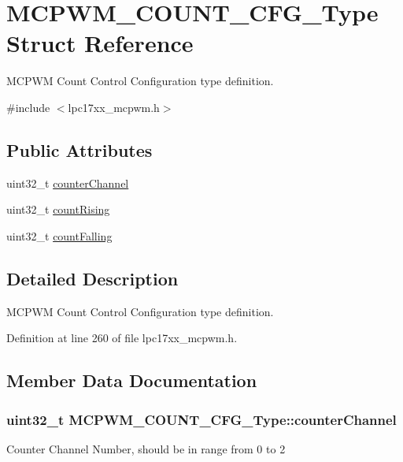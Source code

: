 \hypertarget{struct_m_c_p_w_m___c_o_u_n_t___c_f_g___type}{\section{\-M\-C\-P\-W\-M\-\_\-\-C\-O\-U\-N\-T\-\_\-\-C\-F\-G\-\_\-\-Type \-Struct \-Reference}
\label{struct_m_c_p_w_m___c_o_u_n_t___c_f_g___type}
}


\-M\-C\-P\-W\-M \-Count \-Control \-Configuration type definition.  




{\ttfamily \#include $<$lpc17xx\-\_\-mcpwm.\-h$>$}

\subsection*{\-Public \-Attributes}
\begin{DoxyCompactItemize}
\item 
uint32\-\_\-t \hyperlink{struct_m_c_p_w_m___c_o_u_n_t___c_f_g___type_ac66149ba964bd1a573cf0a33191ab229}{counter\-Channel}
\item 
uint32\-\_\-t \hyperlink{struct_m_c_p_w_m___c_o_u_n_t___c_f_g___type_a687fbc466690659d363536f244a7f89a}{count\-Rising}
\item 
uint32\-\_\-t \hyperlink{struct_m_c_p_w_m___c_o_u_n_t___c_f_g___type_ab6d3905d27760a4985407df2b5795f56}{count\-Falling}
\end{DoxyCompactItemize}


\subsection{\-Detailed \-Description}
\-M\-C\-P\-W\-M \-Count \-Control \-Configuration type definition. 

\-Definition at line 260 of file lpc17xx\-\_\-mcpwm.\-h.



\subsection{\-Member \-Data \-Documentation}
\hypertarget{struct_m_c_p_w_m___c_o_u_n_t___c_f_g___type_ac66149ba964bd1a573cf0a33191ab229}{
\subsubsection[{counter\-Channel}]{\setlength{\rightskip}{0pt plus 5cm}uint32\-\_\-t {\bf \-M\-C\-P\-W\-M\-\_\-\-C\-O\-U\-N\-T\-\_\-\-C\-F\-G\-\_\-\-Type\-::counter\-Channel}}}\label{struct_m_c_p_w_m___c_o_u_n_t___c_f_g___type_ac66149ba964bd1a573cf0a33191ab229}
\-Counter \-Channel \-Number, should be in range from 0 to 2 

